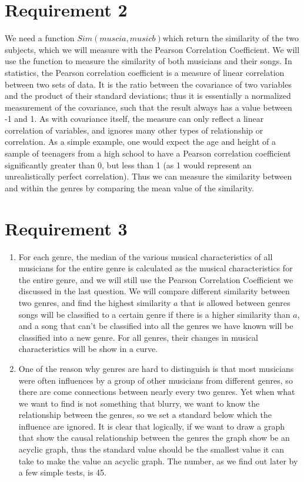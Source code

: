 \documentclass{article}
\begin{document}
\section{Requirement 2}
We need a function $Sim(musci a, music b)$which return the similarity of the two subjects, which we will measure with the Pearson Correlation Coefficient.
We will use the function to
measure the similarity of both musicians and their songs. In statistics, the Pearson correlation coefficient  is a measure of linear correlation between
two sets of data. It is the ratio between the covariance of two variables and the product of their standard deviations; thus it is essentially a normalized
measurement of the covariance, such that the result always has a value between -1 and 1. As with covariance itself, the measure can only reflect a linear
correlation of variables, and ignores many other types of relationship or correlation. As a simple example, one would expect the age and height of
a sample of teenagers from a high school to have a Pearson correlation coefficient significantly greater than 0, but less than 1
(as 1 would represent an unrealistically perfect correlation).
Thus we can measure the similarity between and within the genres by comparing the mean value of the similarity.
\section{Requirement 3}
\begin{enumerate}
    \item For each genre, the median of the various musical characteristics of all musicians for the entire genre is calculated as the musical characteristics
    for the entire genre, and we will still use the Pearson Correlation Coefficient we discussed in the last question. We will compare different similarity between two
    genres, and find the highest similarity $a$ that is allowed between genres songs will be classified to a certain genre if there is a higher similarity than $a$, and a song
    that can't be classified into all the genres we have known will be classified into a new genre. For all genres, their changes in musical characteristics will be show in
    a curve.
 
    \item One of the reason why genres are hard to distinguish is that most musicians were often influences by a group of other musicians from different genres, so there are 
    come connections between nearly every two genres. Yet when what we want to find is not something that blurry, we want to know the relationship between the genres,
    so we set a standard below which the influence are ignored. It is clear that logically, if we want to draw a graph that show the causal relationship between the genres 
    the graph show be an acyclic graph, thus the standard value should be the smallest value it can take to make the value an acyclic graph. The number, as we find out later
    by a few simple tests, is 45.
\end{enumerate}
\end{document}
